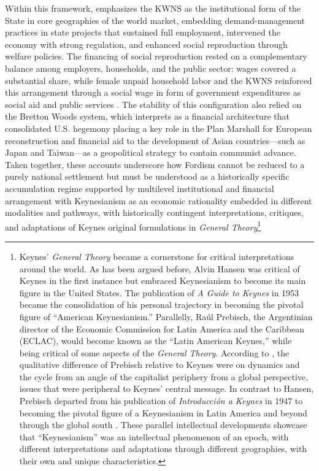 \documentclass[11pt]{article}
\begin{document}
Within this framework, \citet{jessop2002} emphasizes the KWNS as the institutional form of the State in core geographies of the world market, embedding demand-management practices in state projects that sustained full employment, intervened the economy with strong regulation, and enhanced social reproduction through welfare policies. The financing of social reproduction rested on a complementary balance among employers, households, and the public sector: wages covered a substantial share, while female unpaid household labor and the KWNS reinforced this arrangement through a social wage in form of government expenditures as social aid and public services \citep{moos2021}. The stability of this configuration also relied on the Bretton Woods system, which \citet{vernengo2021} interprets as a financial architecture that consolidated U.S. hegemony placing a key role in the Plan Marshall for European reconstruction and financial aid to the development of Asian countries---such as Japan and Taiwan---as a geopolitical strategy to contain communist advance. Taken together, these accounts underscore how Fordism cannot be reduced to a purely national settlement but must be understood as a historically specific accumulation regime supported by multilevel institutional and financial arrangement with Keynesianism as an economic rationality embedded in different modalities and pathways, with historically contingent interpretations, critiques, and adaptations of Keynes original formulations in \emph{General Theory}\footnote{Keynes' \emph{General Theory} became a cornerstone for critical interpretations around the world. As has been argued before, Alvin Hansen was critical of Keynes in the first instance but embraced Keynesianism to become its main figure in the United States. The publication of \emph{A Guide to Keynes} in 1953 became the consolidation of his personal trajectory in becoming the pivotal figure of ``American Keynesianism.'' Parallelly, Ra{\'u}l Prebisch, the Argentinian director of the Economic Commission for Latin America and the Caribbean (ECLAC), would become known as the ``Latin American Keynes,'' while being critical of some aspects of the \emph{General Theory}. According to \citet{caldenteyvernengo2016}, the qualitative difference of Prebisch relative to Keynes were on dynamics and the cycle from an angle of the capitalist periphery from a global perspective, issues that were peripheral to Keynes' central message. In contrast to Hansen, Prebisch departed from his publication of \emph{Introducci{\'o}n a Keynes} in 1947 to becoming the pivotal figure of a Keynesianism in Latin America and beyond through the global south \citep{prebisch1947}. These parallel intellectual developments showcase that ``Keynesianism'' was an intellectual phenomenon of an epoch, with different interpretations and adaptations through different geographies, with their own and unique characteristics.}
\end{document}
